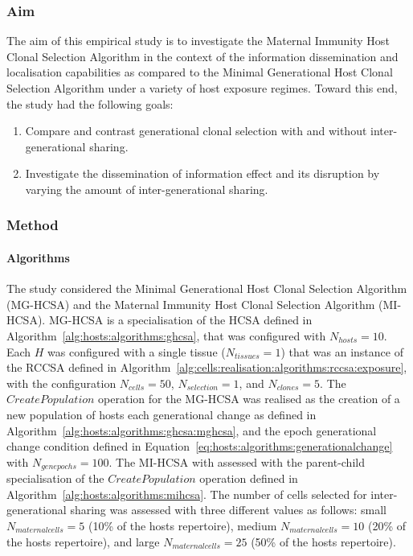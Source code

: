 \subsubsection{Aim}
The aim of this empirical study is to investigate the Maternal Immunity Host Clonal Selection Algorithm in the context of the information dissemination and localisation capabilities as compared to the Minimal Generational Host Clonal Selection Algorithm under a variety of host exposure regimes. Toward this end, the study had the following goals:

\begin{enumerate}
	\item Compare and contrast generational clonal selection with and without inter-generational sharing. 
	\item Investigate the dissemination of information effect and its disruption by varying the amount of inter-generational sharing. 
\end{enumerate}

%
%
\subsubsection{Method}
	
%
%
\paragraph{Algorithms}
The study considered the Minimal Generational Host Clonal Selection Algorithm (MG-HCSA) and the Maternal Immunity Host Clonal Selection Algorithm (MI-HCSA).
MG-HCSA is a specialisation of the HCSA defined in Algorithm~\ref{alg:hosts:algorithms:ghcsa}, that was configured with $N_{hosts}=10$. Each $H$ was configured with a single tissue ($N_{tissues}=1$) that was an instance of the RCCSA defined in Algorithm~\ref{alg:cells:realisation:algorithms:rccsa:exposure}, with the configuration $N_{cells}=50$, $N_{selection}=1$, and $N_{clones}=5$. The $CreatePopulation$ operation for the MG-HCSA was realised as the creation of a new population of hosts each generational change as defined in Algorithm~\ref{alg:hosts:algorithms:ghcsa:mghcsa}, and the epoch generational change condition defined in Equation~\ref{eq:hosts:algorithms:generationalchange} with $N_{genepochs}=100$.
The MI-HCSA with assessed with the parent-child specialisation of the $CreatePopulation$ operation defined in Algorithm~\ref{alg:hosts:algorithms:mihcsa}. The number of cells selected for inter-generational sharing was assessed with three different values as follows: small $N_{maternalcells}=5$ (10\% of the hosts repertoire), medium $N_{maternalcells}=10$ (20\% of the hosts repertoire), and large $N_{maternalcells}=25$ (50\% of the hosts repertoire).

